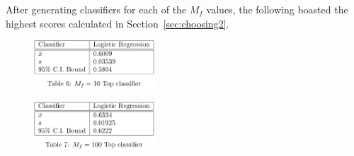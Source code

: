 \documentclass[11pt]{article}
\begin{document}
After generating classifiers for each of the $M_f$ values, 
the following boasted the highest scores calculated in Section~\ref{sec:choosing2}.


\begin{figure}[H]
	\centering
	\includegraphics[width = 0.4\textwidth]{mf10.png}
	\label{tbl:mf10}
\end{figure} 


\begin{figure}[H]
	\centering
	\includegraphics[width = 0.4\textwidth]{mf100.png}
	\label{tbl:mf100}
\end{figure} 
\end{document}
